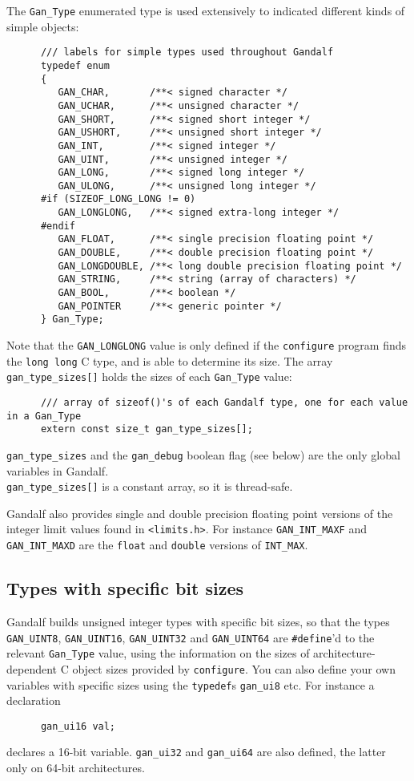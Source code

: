The {\tt Gan\_Type} enumerated type is used extensively to indicated
different kinds of simple objects:
\begin{verbatim}
      /// labels for simple types used throughout Gandalf
      typedef enum
      {
         GAN_CHAR,       /**< signed character */
         GAN_UCHAR,      /**< unsigned character */
         GAN_SHORT,      /**< signed short integer */
         GAN_USHORT,     /**< unsigned short integer */
         GAN_INT,        /**< signed integer */
         GAN_UINT,       /**< unsigned integer */
         GAN_LONG,       /**< signed long integer */
         GAN_ULONG,      /**< unsigned long integer */
      #if (SIZEOF_LONG_LONG != 0)
         GAN_LONGLONG,   /**< signed extra-long integer */
      #endif
         GAN_FLOAT,      /**< single precision floating point */
         GAN_DOUBLE,     /**< double precision floating point */
         GAN_LONGDOUBLE, /**< long double precision floating point */
         GAN_STRING,     /**< string (array of characters) */
         GAN_BOOL,       /**< boolean */
         GAN_POINTER     /**< generic pointer */
      } Gan_Type;
\end{verbatim}
Note that the {\tt GAN\_LONGLONG} value is only defined if the {\tt configure}
program finds the {\tt long~long} C type, and is able to determine its size.
The array {\tt gan\_type\_sizes[]} holds the sizes of each {\tt Gan\_Type}
value:
\begin{verbatim}
      /// array of sizeof()'s of each Gandalf type, one for each value in a Gan_Type
      extern const size_t gan_type_sizes[];
\end{verbatim}
{\tt gan\_type\_sizes} and the {\tt gan\_debug} boolean flag
(see below) are the only global variables in Gandalf.\\{\tt gan\_type\_sizes[]}
is a constant array, so it is thread-safe.

Gandalf also provides single and double precision floating point versions
of the integer limit values found in {\tt <limits.h>}. For instance
{\tt GAN\_INT\_MAXF} and {\tt GAN\_INT\_MAXD} are the {\tt float} and
{\tt double} versions of {\tt INT\_MAX}.

\subsection{Types with specific bit sizes}
Gandalf builds unsigned integer types with specific bit sizes, so that
the types {\tt GAN\_UINT8}, {\tt GAN\_UINT16}, {\tt GAN\_UINT32} and
{\tt GAN\_UINT64} are {\tt \#define}'d to the relevant {\tt Gan\_Type}
value, using the information on the sizes of architecture-dependent
C object sizes provided by {\tt configure}. You can also define your
own variables with specific sizes using the {\tt typedef}s {\tt gan\_ui8}
etc. For instance a declaration
\begin{verbatim}
      gan_ui16 val;
\end{verbatim}
declares a 16-bit variable. {\tt gan\_ui32} and {\tt gan\_ui64} are 
also defined, the latter only on 64-bit architectures.

